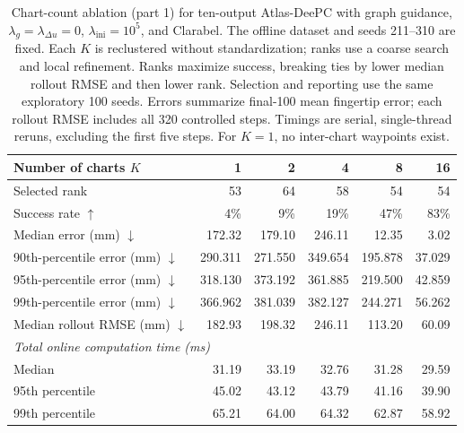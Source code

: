 \documentclass[10pt]{article}
\begin{document}
\begin{table}[htbp]
\centering
\small
\begin{tabular}{lrrrrr}
\toprule
Number of charts $K$ & 1 & 2 & 4 & 8 & 16 \\
\midrule
Selected rank & 53 & 64 & 58 & 54 & 54 \\
Success rate $\uparrow$ & 4\% & 9\% & 19\% & 47\% & 83\% \\
Median error (mm) $\downarrow$ & 172.32 & 179.10 & 246.11 & 12.35 & 3.02 \\
90th-percentile error (mm) $\downarrow$ & 290.311 & 271.550 & 349.654 & 195.878 & 37.029 \\
95th-percentile error (mm) $\downarrow$ & 318.130 & 373.192 & 361.885 & 219.500 & 42.859 \\
99th-percentile error (mm) $\downarrow$ & 366.962 & 381.039 & 382.127 & 244.271 & 56.262 \\
Median rollout RMSE (mm) $\downarrow$ & 182.93 & 198.32 & 246.11 & 113.20 & 60.09 \\
\midrule
\multicolumn{6}{l}{\textit{Total online computation time (ms)}} \\
Median & 31.19 & 33.19 & 32.76 & 31.28 & 29.59 \\
95th percentile & 45.02 & 43.12 & 43.79 & 41.16 & 39.90 \\
99th percentile & 65.21 & 64.00 & 64.32 & 62.87 & 58.92 \\
\bottomrule
\end{tabular}
\caption{Chart-count ablation (part 1) for ten-output Atlas-DeePC with graph guidance, $\lambda_g=\lambda_{\Delta u}=0$, $\lambda_{\mathrm{ini}}=10^5$, and Clarabel. The offline dataset and seeds 211--310 are fixed. Each $K$ is reclustered without standardization; ranks use a coarse search and local refinement. Ranks maximize success, breaking ties by lower median rollout RMSE and then lower rank. Selection and reporting use the same exploratory 100 seeds. Errors summarize final-100 mean fingertip error; each rollout RMSE includes all 320 controlled steps. Timings are serial, single-thread reruns, excluding the first five steps. For $K=1$, no inter-chart waypoints exist.}
\label{tab:chart-count-rank-1}
\end{table}
\end{document}
